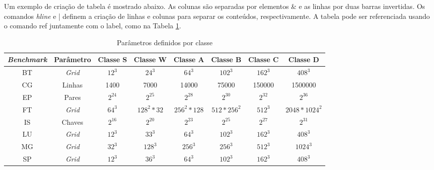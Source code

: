 Um exemplo de criação de tabela é mostrado abaixo. As colunas são separadas por elementos \& e as linhas por duas barras invertidas. 
  Os comandos \textit{hline} e | definem a criação de linhas e colunas para separar os conteúdos, respectivamente. A tabela pode
  ser referenciada usando o comando ref juntamente com o label, como na Tabela \ref{tab:classesNas}. 

  \begin{table}[H]
    \centering
    \footnotesize
    \setlength{\abovecaptionskip}{0pt}
    \setlength{\belowcaptionskip}{0pt}
    \caption[Parâmetros definidos por classe]{Parâmetros definidos por classe}
    \label{tab:classesNas}
    \begin{tabular}{c|c|c|c|c|c|c|c}
	\hline \hline
	\textit{Benchmark} &	Parâmetro &	Classe S &	Classe W &	Classe A &	Classe B &	Classe C &	Classe D \\ 
	\hline \hline
 	BT & \textit{Grid}	& $12^3$	& $24^3$ 	& $64^3$	& $102^3$ 	& $162^3$	& $408^3$ \\ 
	CG & Linhas		& 1400		& 7000 		& 14000 	& 75000 	& 150000 	& 1500000 \\ 
	EP & Pares 		& $2^{24}$	& $2^{25}$	& $2^{28}$	& $2^{30}$	& $2^{32}$	& $2^{36}$ \\
	FT & \textit{Grid}	& $64^3$	& $128^2*32$	& $256^2*128$	& $512*256^2$	& $512^3$	& $2048*1024^2$ \\ 
	IS & Chaves		& $2^{16}$	& $2^{20}$	& $2^{23}$	& $2^{25}$	& $2^{27}$	& $2^{31}$ \\ 
	LU & \textit{Grid}	& $12^3$	& $33^3$	& $64^3$	& $102^3$	& $162^3$	& $408^3$ \\
	MG & \textit{Grid}	& $32^3$	& $128^3$	& $256^3$	& $256^3$	& $512^3$	& $1024^3$ \\ 
	SP & \textit{Grid}	& $12^3$	& $36^3$	& $64^3$	& $102^3$	& $162^3$	& $408^3$ \\
	\hline \hline
    \end{tabular}
  \end{table}